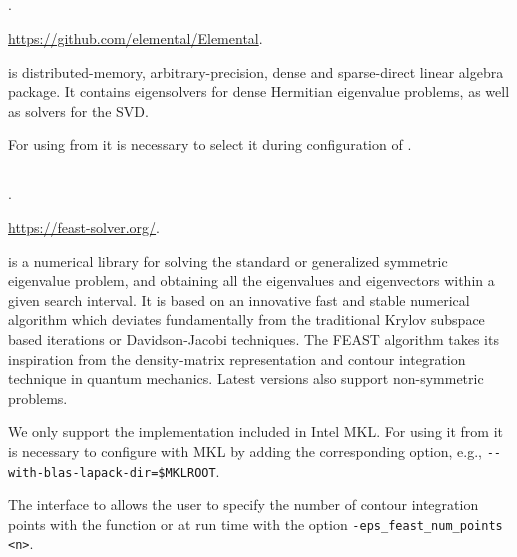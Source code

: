 \subsection*{\underline{\elemental}}
\begin{description}
\setlength{\itemsep}{0pt}
\item[References.]\citep{Poulson:2013:ELE}.
\item[Website.] \url{https://github.com/elemental/Elemental}.
\item[Summary.] \elemental is distributed-memory, arbitrary-precision, dense and sparse-direct linear algebra package. It contains eigensolvers for dense Hermitian eigenvalue problems, as well as solvers for the SVD.
\item[Installation.] For using \elemental from \slepc it is necessary to select it during configuration of \petsc.
\end{description}

\subsection*{\underline{\feast}}
\begin{description}
\setlength{\itemsep}{0pt}
\item[References.]\citep{Polizzi:2009:DAS}.
\item[Website.] \url{https://feast-solver.org/}.
\item[Summary.] \feast is a numerical library for solving the standard or generalized symmetric eigenvalue problem, and obtaining all the eigenvalues and eigenvectors within a given search interval. It is based on an innovative fast and stable numerical algorithm which deviates fundamentally from the traditional Krylov subspace based iterations or Davidson-Jacobi techniques. The FEAST algorithm takes its inspiration from the density-matrix representation and contour integration technique in quantum mechanics. Latest versions also support non-symmetric problems.
\item[Installation.] We only support the \feast implementation included in Intel MKL. For using it from \slepc it is necessary to configure \petsc with MKL by adding the corresponding option, e.g., \Verb!--with-blas-lapack-dir=$MKLROOT!.
\item[Specific options.] The \slepc interface to \feast allows the user to specify the number of contour integration points with the function  or at run time with the option \Verb!-eps_feast_num_points <n>!.
\end{description}

